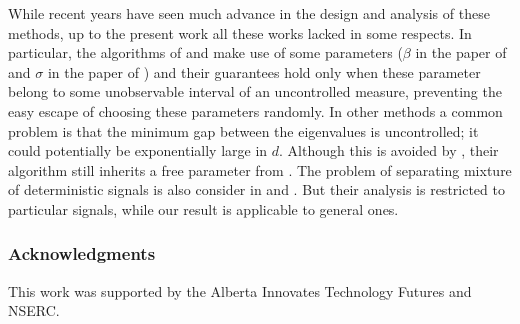 \documentclass{article} %
\theoremstyle{definition}
\begin{document}
While recent years have seen much advance in the design and analysis of these methods, up to the present work all these works lacked in some respects.
In particular, the algorithms of \citet{arora2012provable} and \citet{goyal2014fourier} make use of some  parameters ($\beta$ in the paper of \citet{arora2012provable} and $\sigma$ in the paper of \citet{goyal2014fourier}) and their guarantees hold only when these parameter belong to some unobservable interval of an uncontrolled measure, preventing the easy escape of choosing these parameters randomly. In other methods
\citep{anandkumar2012tensordecomposition,anandkumar2012method,hsu2013learning} 
a common problem is that the minimum gap between the eigenvalues is uncontrolled; 
it could potentially be exponentially large in $d$.
Although this is avoided by \citet{vempala2014max}, their algorithm still inherits a free parameter from \citet{goyal2014fourier}.
The problem of separating mixture of deterministic signals is also consider in \citep{kirimoto2011separation} and \citep{forootan2013separation}. But their analysis is restricted to particular signals, while our result is applicable to general ones.

\subsubsection*{Acknowledgments}
This work was supported by the Alberta Innovates Technology Futures and NSERC.
\fi


\end{document}

